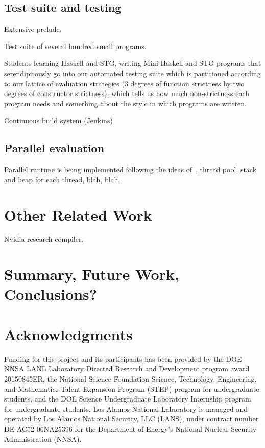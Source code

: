 \documentclass{llncs}
\begin{document}
\subsection{Test suite and testing}

Extensive prelude.

Test suite of several hundred small programs.

Students learning Haskell and STG, writing Mini-Haskell and STG programs that
serendipitously go into our automated testing suite which is partitioned
according to our lattice of evaluation strategies (3 degrees of function
strictness by two degrees of constructor strictness), which tells us how much
non-strictness each program needs and something about the style in which
programs are written.

Continuous build system (Jenkins)


\subsection{Parallel evaluation}

Parallel runtime is being implemented following the ideas
of~\cite{SPJs-many-papers}, thread pool, stack and heap for each thread, blah,
blah.

\section{Other Related Work}
Nvidia research compiler.

\section{Summary, Future Work, Conclusions?}

\section{Acknowledgments}

Funding for this project and its participants has been provided by the DOE
NNSA LANL Laboratory Directed Research and Development program award
20150845ER, the National Science Foundation Science, Technology, Engineering,
and Mathematics Talent Expansion Program (STEP) program for undergraduate
students, and the DOE Science Undergraduate Laboratory Internship program for
undergraduate students.
%
Los Alamos National Laboratory is managed and operated by Los Alamos National
Security, LLC (LANS), under contract number DE-AC52-06NA25396 for the
Department of Energy’s National Nuclear Security Administration (NNSA).

\cite{ghc-as-library}
\cite{Heren02}

%
%




\end{document}
